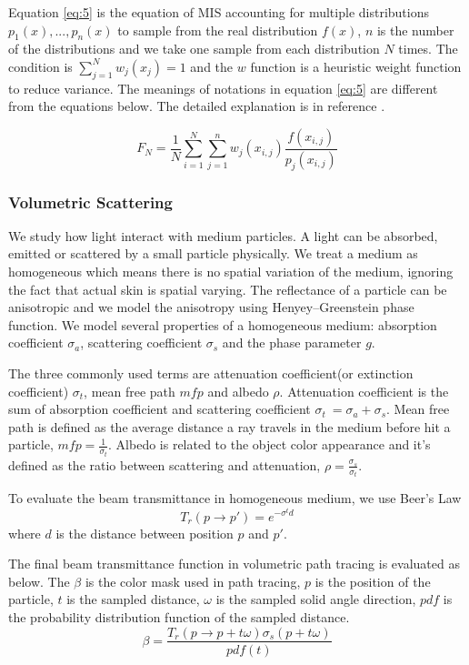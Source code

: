 \documentclass[letterpaper,12pt]{article}
\begin{document}
Equation \ref{eq:5} is the equation of MIS accounting for multiple distributions $p_1(x), ... , p_n(x)$ to sample from the real distribution $f(x)$, $n$ is the number of the distributions and we take one sample from each distribution $N$ times. The condition is $\sum_{j=1}^N w_j(x_{j}) = 1$ and the $w$ function is a heuristic weight function to reduce variance. The meanings of notations in equation \ref{eq:5} are different from the equations below. The detailed explanation is in reference \cite{owen2000safe}.

\begin{equation} \label{eq:5}
    F_N = \frac{1}{N}\sum_{i=1}^N \sum_{j=1}^n w_j(x_{i,j}) \frac{f(x_{i,j})}{p_j(x_{i,j})}
\end{equation}

\subsubsection{Volumetric Scattering}
We study how light interact with medium particles. A light can be absorbed, emitted or scattered by a small particle physically. We treat a medium as homogeneous which means there is no spatial variation of the medium, ignoring the fact that actual skin is spatial varying. The reflectance of a particle can be anisotropic and we model the anisotropy using Henyey–Greenstein phase function. We model several properties of a homogeneous medium: absorption coefficient $\sigma_a$, scattering coefficient $\sigma_s$ and the phase parameter $g$.

The three commonly used terms are attenuation coefficient(or extinction coefficient) $\sigma_t$, mean free path $mfp$ and albedo $\rho$. Attenuation coefficient is the sum of absorption coefficient and scattering coefficient $\sigma_t\ = \sigma_a + \sigma_s$. Mean free path is defined as the average distance a ray travels in the medium before hit a particle, $mfp = \frac{1}{\sigma_t}$. Albedo is related to the object color appearance and it's defined as the ratio between scattering and attenuation, $\rho = \frac{\sigma_s}{\sigma_t}$\cite{pharr2016physically}.

To evaluate the beam transmittance in homogeneous medium, we use Beer's Law
\begin{equation}
    T_r(p \longrightarrow p') = e^{-\sigma^t d}
\end{equation}
where $d$ is the distance between position $p$ and $p'$.

The final beam transmittance function in volumetric path tracing is evaluated as below. The $\beta$ is the color mask used in path tracing, $p$ is the position of the particle, $t$ is the sampled distance, $\omega$ is the sampled solid angle direction, $pdf$ is the probability distribution function of the sampled distance.
\begin{equation}
    \beta = \frac{T_r(p \longrightarrow p + t\omega) \sigma_s(p + t\omega)}{pdf(t)}
\end{equation}
\end{document}

